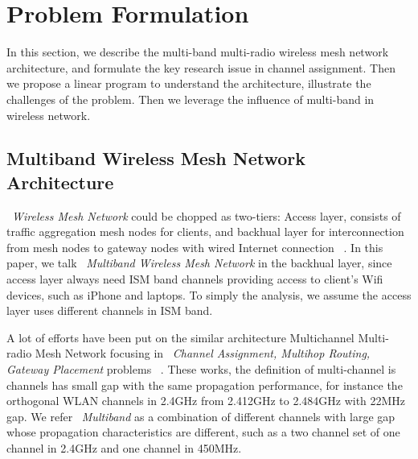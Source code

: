\section{Problem Formulation}
\label{sec:problemformulation}



In this section, we describe the multi-band multi-radio wireless mesh network architecture, and formulate the key research issue in channel assignment. Then we propose a linear program to understand the architecture, illustrate the challenges of the problem.
Then we leverage the influence of multi-band in wireless network.
 
\subsection{Multiband Wireless Mesh Network Architecture}
\label{subsec:architecture}
~\emph{Wireless Mesh Network} could be chopped as two-tiers:
Access layer, consists of traffic aggregation mesh nodes for clients, and backhual layer for interconnection from mesh nodes to gateway nodes with wired Internet connection ~\cite{akyildiz2005wireless}. 
In this paper, we talk ~\emph{Multiband Wireless Mesh Network} in the backhual layer, since access layer always need ISM band channels providing access to client's Wifi devices, such as iPhone and laptops. To simply the analysis, we assume the access layer uses different channels in ISM band.

A lot of efforts have been put on the similar architecture Multichannel Multi-radio Mesh Network focusing in ~\emph{Channel Assignment, Multihop Routing, Gateway Placement} problems ~\cite{si2010overview}.
These works, the definition of multi-channel is channels has small gap with the same propagation performance, for instance the orthogonal WLAN channels in 2.4GHz from 2.412GHz to 2.484GHz with 22MHz gap.
We refer ~\emph{Multiband} as a combination of different channels with large gap whose propagation characteristics are different, such as a two channel set of one channel in 2.4GHz and one channel in 450MHz.

